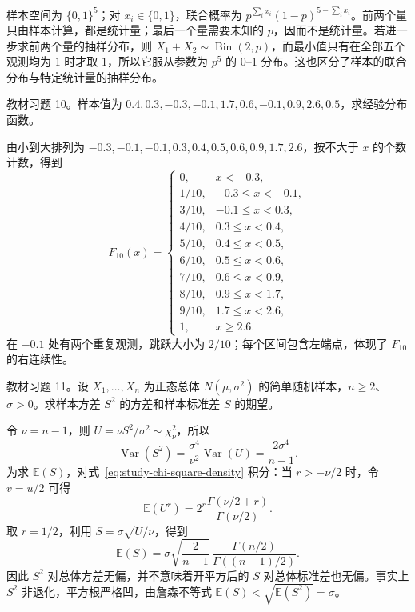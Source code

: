 \begin{solve}
样本空间为 $\{0,1\}^5$；对 $x_i\in\{0,1\}$，联合概率为 $p^{\sum_i x_i}(1-p)^{5-\sum_i x_i}$。前两个量只由样本计算，都是统计量；最后一个量需要未知的 $p$，因而不是统计量。若进一步求前两个量的抽样分布，则 $X_1+X_2\sim\operatorname{Bin}(2,p)$，而最小值只有在全部五个观测均为 $1$ 时才取 $1$，所以它服从参数为 $p^5$ 的 $0$--$1$ 分布。这也区分了样本的联合分布与特定统计量的抽样分布。
\end{solve}

\begin{example}
\label{ex:study-empirical-cdf-exercise}
教材习题 10。样本值为 $0.4,0.3,-0.3,-0.1,1.7,0.6,-0.1,0.9,2.6,0.5$，求经验分布函数。
\end{example}

\begin{solve}
由小到大排列为 $-0.3,-0.1,-0.1,0.3,0.4,0.5,0.6,0.9,1.7,2.6$，按不大于 $x$ 的个数计数，得到
\[
  F_{10}(x)=
  \begin{cases}
    0,&x<-0.3,\\
    1/10,&-0.3\le x<-0.1,\\
    3/10,&-0.1\le x<0.3,\\
    4/10,&0.3\le x<0.4,\\
    5/10,&0.4\le x<0.5,\\
    6/10,&0.5\le x<0.6,\\
    7/10,&0.6\le x<0.9,\\
    8/10,&0.9\le x<1.7,\\
    9/10,&1.7\le x<2.6,\\
    1,&x\ge2.6.
  \end{cases}
\]
在 $-0.1$ 处有两个重复观测，跳跃大小为 $2/10$；每个区间包含左端点，体现了 $F_{10}$ 的右连续性。
\end{solve}

\begin{example}
\label{ex:study-normal-variance-moments-exercise}
教材习题 11。设 $X_1,\ldots,X_n$ 为正态总体 $N(\mu,\sigma^2)$ 的简单随机样本，$n\ge2$、$\sigma>0$。求样本方差 $S^2$ 的方差和样本标准差 $S$ 的期望。
\end{example}

\begin{solve}
令 $\nu=n-1$，则 $U=\nu S^2/\sigma^2\sim\chi^2_\nu$，所以
\[
  \operatorname{Var}(S^2)
  =\frac{\sigma^4}{\nu^2}\operatorname{Var}(U)
  =\frac{2\sigma^4}{n-1}.
\]
为求 $\mathbb E(S)$，对式~\eqref{eq:study-chi-square-density} 积分：当 $r>-\nu/2$ 时，令 $v=u/2$ 可得
\[
  \mathbb E(U^r)
   =2^r\frac{\Gamma(\nu/2+r)}{\Gamma(\nu/2)}.
\]
取 $r=1/2$，利用 $S=\sigma\sqrt{U/\nu}$，得到
\[
  \mathbb E(S)
  =\sigma\sqrt{\frac2{n-1}}\,
       \frac{\Gamma(n/2)}{\Gamma((n-1)/2)}.
\]
因此 $S^2$ 对总体方差无偏，并不意味着开平方后的 $S$ 对总体标准差也无偏。事实上 $S^2$ 非退化，平方根严格凹，由詹森不等式 $\mathbb E(S)<\sqrt{\mathbb E(S^2)}=\sigma$。
\end{solve}

